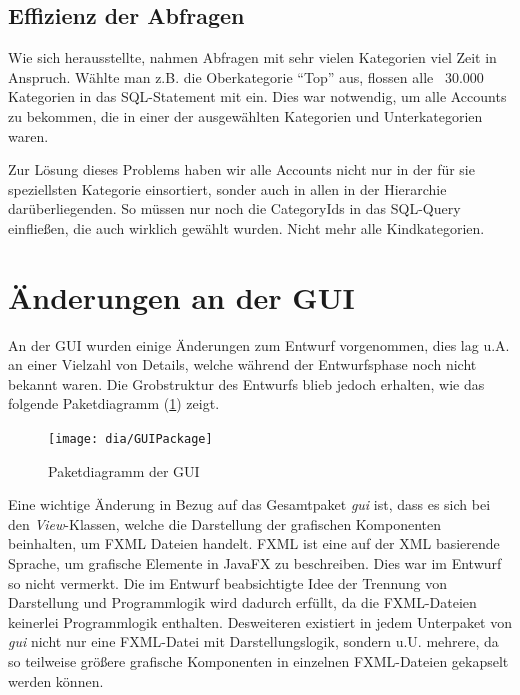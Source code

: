 \subsection{Effizienz der Abfragen}
Wie sich herausstellte, nahmen Abfragen mit sehr vielen Kategorien viel Zeit in Anspruch. Wählte man z.B. die Oberkategorie "`Top"' aus, flossen alle ~30.000 Kategorien in das SQL-Statement mit ein. Dies war notwendig, um alle Accounts zu bekommen, die in einer der ausgewählten Kategorien und Unterkategorien waren.

Zur Lösung dieses Problems haben wir alle Accounts nicht nur in der für sie speziellsten Kategorie einsortiert, sonder auch in allen in der Hierarchie darüberliegenden. So müssen nur noch die CategoryIds in das SQL-Query einfließen, die auch wirklich gewählt wurden. Nicht mehr alle Kindkategorien.

\section{Änderungen an der GUI}
An der GUI wurden einige Änderungen zum Entwurf vorgenommen, dies lag u.A. an einer Vielzahl von Details, welche während der Entwurfsphase noch nicht bekannt waren. 
Die Grobstruktur des Entwurfs blieb jedoch erhalten, wie das folgende Paketdiagramm (\ref{fig:GUI}) zeigt.
\begin{figure}[h!]
	\centering
	\texttt{[image: dia/GUIPackage]}
	\caption{Paketdiagramm der GUI}
	\label{fig:GUI}
\end{figure}

Eine wichtige Änderung in Bezug auf das Gesamtpaket \emph{gui} ist, dass es sich bei den \emph{View}-Klassen, welche die Darstellung der grafischen Komponenten beinhalten, um FXML Dateien handelt. FXML ist eine auf der  XML basierende Sprache, um grafische Elemente in JavaFX zu beschreiben. Dies war im Entwurf so nicht vermerkt. Die im Entwurf beabsichtigte Idee der Trennung von Darstellung und Programmlogik wird dadurch erfüllt, da die FXML-Dateien keinerlei Programmlogik enthalten. Desweiteren existiert in jedem Unterpaket von \emph{gui} nicht nur eine FXML-Datei mit Darstellungslogik, sondern u.U. mehrere, da so teilweise größere grafische Komponenten in einzelnen FXML-Dateien gekapselt werden können.

